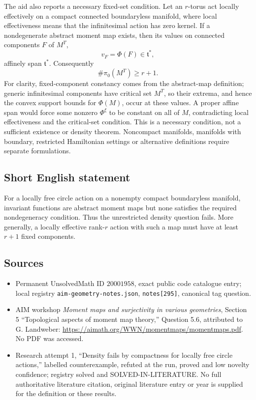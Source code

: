 \documentclass[11pt]{article}
\begin{document}
The aid also reports a necessary fixed-set condition. Let an \(r\)-torus act locally effectively on a compact connected boundaryless manifold, where local effectiveness means that the infinitesimal action has zero kernel. If a nondegenerate abstract moment map exists, then its values on connected components \(F\) of \(M^T\),
\[
 v_F=\Phi(F)\in\mathfrak t^*,
\]
affinely span \(\mathfrak t^*\). Consequently
\[
 \#\pi_0(M^T)\geq r+1.
\]
For clarity, fixed-component constancy comes from the abstract-map definition; generic infinitesimal components have critical set \(M^T\), so their extrema, and hence the convex support bounds for \(\Phi(M)\), occur at these values. A proper affine span would force some nonzero \(\Phi^\xi\) to be constant on all of \(M\), contradicting local effectiveness and the critical-set condition. This is a necessary condition, not a sufficient existence or density theorem. Noncompact manifolds, manifolds with boundary, restricted Hamiltonian settings or alternative definitions require separate formulations.
\subsection{Short English statement}
For a locally free circle action on a nonempty compact boundaryless manifold, invariant functions are abstract moment maps but none satisfies the required nondegeneracy condition. Thus the unrestricted density question fails. More generally, a locally effective rank-\(r\) action with such a map must have at least \(r+1\) fixed components.
\subsection{Sources}
\begin{itemize}
\item Permanent UnsolvedMath ID \(20001958\), exact public code catalogue entry; local registry \texttt{aim-geometry-notes.json}, \texttt{notes[295]}, canonical tag question.
\item AIM workshop \emph{Moment maps and surjectivity in various geometries}, Section 5 ``Topological aspects of moment map theory,'' Question 5.6, attributed to G. Landweber: \url{https://aimath.org/WWN/momentmaps/momentmaps.pdf}. No PDF was accessed.
\item Research attempt 1, ``Density fails by compactness for locally free circle actions,'' labelled counterexample, refuted at the run, proved and low novelty confidence; registry solved and SOLVED-IN-LITERATURE. No full authoritative literature citation, original literature entry or year is supplied for the definition or these results.
\end{itemize}
\end{document}
